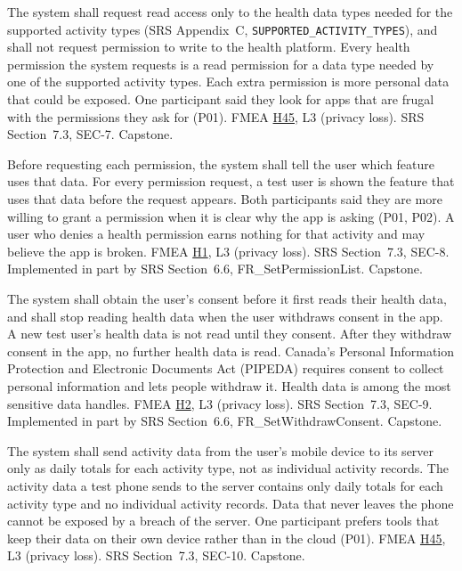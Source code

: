 \documentclass{article}
\newcommand{\hazref}[1]{\hyperref[#1]{#1}}
\begin{document}
\begin{description}

{The system shall request read access only to the health data types needed for
the supported activity types (SRS Appendix~C,
\texttt{SUPPORTED\_ACTIVITY\_TYPES}), and shall not request permission to
write to the health platform.}
{Every health permission the system requests is a read permission for a data
type needed by one of the supported activity types.}
{Each extra permission is more personal data that could be exposed. One
participant said they look for apps that are frugal with the permissions they
ask for (P01).}
{FMEA \hazref{H45}, L3 (privacy loss).}
{SRS Section~7.3, SEC-7.}
{Capstone.}

{Before requesting each permission, the system shall tell the user which
feature uses that data.}
{For every permission request, a
test user is shown the feature that uses that data before the request appears.}
{Both participants said they are more willing to grant a permission when it is
clear why the app is asking (P01, P02). A user who denies a health permission
earns nothing for that activity and may believe the app is broken.}
{FMEA \hazref{H1}, L3 (privacy loss).}
{SRS Section~7.3, SEC-8. Implemented in part by SRS
Section~6.6, FR\_SetPermissionList.}
{Capstone.}

{The system shall obtain the user's consent before it first reads their health
data, and shall stop reading health data when the user withdraws consent in the
app.}
{A new test user's health data is not read until they consent. After they
withdraw consent in the app, no further health data is read.}
{Canada's Personal Information Protection and Electronic Documents Act (PIPEDA)
requires consent to collect personal information and lets people withdraw it.
Health data is among the most sensitive data \progname{} handles.}
{FMEA \hazref{H2}, L3 (privacy loss).}
{SRS Section~7.3, SEC-9. Implemented in part by SRS
Section~6.6, FR\_SetWithdrawConsent.}
{Capstone.}

{The system shall send activity data from the user's mobile device to its
server only as daily totals for each activity type, not as individual activity
records.}
{The activity data a test phone sends to the server contains only daily totals
for each activity type and no individual activity records.}
{Data that never leaves the phone cannot be exposed by a breach of the server. One participant prefers
tools that keep their data on their own device rather than in the cloud (P01).}
{FMEA \hazref{H45}, L3 (privacy loss).}
{SRS Section~7.3, SEC-10.}
{Capstone.}


\end{description}
\end{document}
